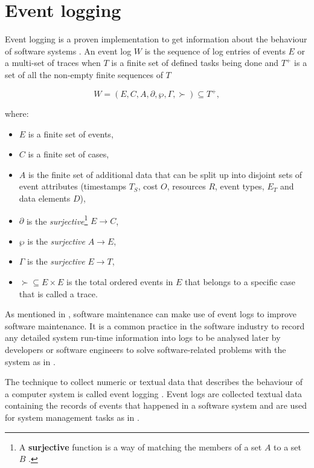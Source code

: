 \clearpage

\section{Event logging}\label{sec:ch1_eventLogging}
Event logging is a proven implementation to get information about the behaviour of software systems \cite{Baccanico2014}.
An event log $W$ is the sequence of log entries of events $E$ or a multi-set of traces when $T$ is a finite set of defined tasks being done and $T^+$ is a set of all the non-empty finite sequences of $T$ \cite{Kherbouche2017}

\begin{equation}
	\label{eq:LogEvent}
	W = (E, C, A, \partial, \wp, \Gamma, \succ) \subseteq T^+,
\end{equation}

where:

\begin{itemize}
	\item $E$ is a finite set of events,
	\item $C$ is a finite set of cases,
	\item $A$ is the finite set of additional data that can be split up into disjoint sets of event attributes (timestamps $T_S$, cost $O$, resources $R$, event types, $E_T$ and data elements $D$),
	\item $\partial$ is the \textit{surjective}\footnote{\label{ftn:Surjective}A \textbf{surjective} function is a way of matching the members of a set $A$ to a set $B$ \cite{Szendrei1990}.} $E\rightarrow C$,
	\item $\wp$ is the \textit{surjective} $A\rightarrow E$,
	\item $\Gamma$ is the \textit{surjective} $E\rightarrow T$,
	\item $\succ \subseteq E\times E$ is the total ordered events in $E$ that belongs to a specific case that is called a trace.
\end{itemize}

As mentioned in , software maintenance can make use of event logs to improve software maintenance. It is a common practice in the software industry to record any detailed system run-time information into logs to be analysed later by developers or software engineers to solve software-related problems with the system as in  \cite{Zhu2019}.\par The technique to collect numeric or textual data that describes the behaviour of a computer system is called event logging \cite{Pecchia2015, Baccanico2014}. Event logs are collected textual data containing the records of events that happened in a software system and are used for system management tasks as in  \cite{Rong2018a, Rong2018, Baccanico2014}.


